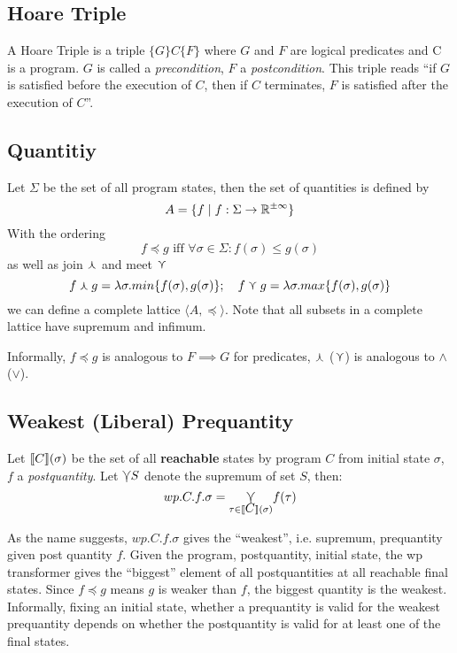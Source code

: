 \documentclass[adraft,hidelinks]{eptcs}
\begin{document}
\subsection{Hoare Triple}
A Hoare Triple is a triple $ \{G\} C \{F\}$ where $G$ and $F$ are logical predicates and C is a program. 
$G$ is called a \textit{precondition}, $F$ a \textit{postcondition}. 
This triple reads ``if $G$ is satisfied before the execution of $C$, then if $C$ terminates, $F$ is satisfied after the execution of $C$''. 

\subsection{Quantitiy}
Let $\Sigma$ be the set of all program states, then the set of quantities is defined by 
\[A=\{f\mid f:\Sigma\to\mathbb{R}^{\pm\infty}\}\] 
With the ordering 
\[f\preceq g \text{ iff } \forall \sigma \in \Sigma: f(\sigma)\leq g(\sigma)\]
as well as join $\curlywedge$ and meet $\curlyvee$
\[f\curlywedge g = \lambda \sigma.min\{f(\sigma), g(\sigma)\}; \ \ \  f\curlyvee g = \lambda \sigma.max\{f(\sigma), g(\sigma) \}\]
we can define a complete lattice $\langle A, \preceq\rangle$. 
Note that all subsets in a complete lattice have supremum and infimum. 

Informally, $f\preceq g$ is analogous to $F\implies G$ for predicates, $\curlywedge$ ($\curlyvee$) is analogous to $\wedge$ ($\vee$). 

\subsection{Weakest (Liberal) Prequantity}
Let $\bkt C (\sigma)$ be the set of all \textbf{reachable} states by program $C$ from initial state $\sigma$, $f$ a \textit{postquantity}. 
Let $\varcurlyvee S$ denote the supremum of set $S$, then: 
\[wp.C.f.\sigma = \underset{\tau\in\bkt C(\sigma)}{\bigmeet} f(\tau)\]

As the name suggests, $wp.C.f.\sigma$ gives the ``weakest'', i.e. supremum, prequantity given post quantity $f$. 
Given the program, postquantity, initial state, the wp transformer gives the ``biggest'' element of all postquantities at all reachable final states. 
Since $f\preceq g$ means $g$ is weaker than $f$, the biggest quantity is the weakest. 
Informally, fixing an initial state, whether a prequantity is valid for the weakest prequantity depends on whether the postquantity is valid for at least one of the final states. 
\begin{comment}
Note that supremum can be not an element of the infinite set.
\end{comment}
\end{document}

